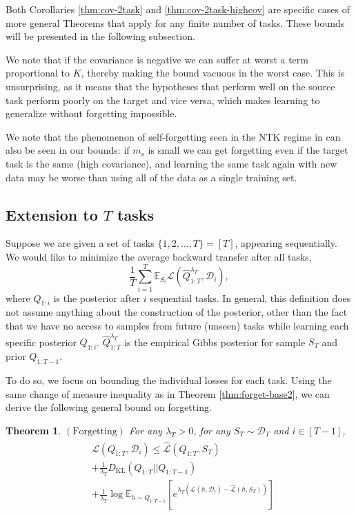 \documentclass{article}
\theoremstyle{plain}
\newtheorem{theorem}{Theorem}[section]
\theoremstyle{definition}
\theoremstyle{remark}
\begin{document}
Both Corollaries \ref{thm:cov-2task} and \ref{thm:cov-2task-highcov} are specific cases of more general Theorems that apply for any finite number of tasks. These bounds will be presented in the following subsection.

We note that if the covariance is negative we can suffer at worst a term proportional to $K$, thereby making the bound vacuous in the worst case. This is unsurprising, as it means that the hypotheses that perform well on the source task perform poorly on the target and vice versa, which makes learning to generalize without forgetting impossible.

We note that the phenomenon of self-forgetting seen in the NTK regime in \citet{karakida2021learning} can also be seen in our bounds: if $m_s$ is small we can get forgetting even if the target task is the same (high covariance), and learning the same task again with new data may be worse than using all of the data as a single training set.

\subsection{Extension to $T$ tasks}

Suppose we are given a set of tasks $\{1,2,\ldots, T\} = [T]$, appearing sequentially.
We would like to minimize the average backward transfer after all tasks, $$\frac{1}{T}\sum_{i=1}^T
\mathbb{E}_{S_i}\mathcal{L}(\hat{Q}^{\lambda_T}_{1:T}, \mathcal{D}_i),$$ where $Q_{1:i}$ is the posterior after $i$ sequential tasks. In general, this definition does not assume anything about the construction of the posterior, other than the fact that we have no access to samples from future (unseen) tasks while learning each specific posterior $Q_{1:i}$. $\hat{Q}^{\lambda_T}_{1:T}$ is the empirical Gibbs posterior for sample $S_T$ and prior $Q_{1:T-1}$.

To do so, we focus on bounding the individual losses for each task.
Using the same change of measure inequality as in Theorem \ref{thm:forget-base2}, we can derive the following general bound on forgetting. 

\begin{theorem} $\mathrm{(Forgetting)}$
For any $\lambda_T>0$, for any $S_T\sim \mathcal{D}_T$ and $i\in [T-1]$,
%
\begin{align} \label{eq:forget-base-T}
\begin{split}
&\mathcal{L}(Q_{1:T}, \mathcal{D}_i) \leq \hat{\mathcal{L}}(Q_{1:T}, S_T)\\ &+ \frac{1}{\lambda_T} D_{\mathrm{KL}}(Q_{1:T}||Q_{1:T-1})
\\&+\frac{1}{\lambda_T}\log\mathbb{E}_{h\sim Q_{1:T-1}}\left [e^{\lambda_T(\mathcal{L}(h,\mathcal{D}_i)-\hat{\mathcal{L}}(h,S_T))} \right ]
\end{split}
\end{align}
\end{theorem}
\end{document}

